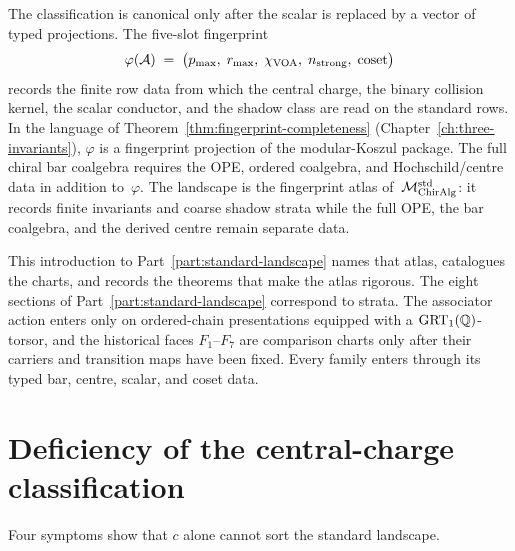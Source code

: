 The classification is canonical only after the scalar is replaced by
a vector of typed projections. The five-slot fingerprint
\begin{equation}
 \varphi(\mathcal{A}) \;=\; \bigl(p_{\max},\; r_{\max},\;
 \chi_{\mathrm{VOA}},\; n_{\mathrm{strong}},\; \mathrm{coset}\bigr)
 \label{eq:part-iii-fingerprint}
\end{equation}
records the finite row data from which the central charge, the
binary collision kernel, the scalar conductor, and the shadow
class are read on the standard rows. In the language of
Theorem~\ref{thm:fingerprint-completeness}
\textup{(}Chapter~\ref{ch:three-invariants}\textup{)}, $\varphi$ is
a fingerprint projection of the modular-Koszul package. The full
chiral bar coalgebra requires the OPE, ordered coalgebra, and
Hochschild/centre data in addition to~$\varphi$. The landscape is the
fingerprint atlas of~$\mathcal{M}_{\mathrm{ChirAlg}}^{\mathrm{std}}$: it records
finite invariants and coarse shadow strata while the full OPE, the bar
coalgebra, and the derived centre remain separate data.

This introduction to Part~\ref{part:standard-landscape}
names that atlas, catalogues the charts, and records the theorems that
make the atlas rigorous. The eight sections of
Part~\ref{part:standard-landscape} correspond to strata. The
associator action enters only on ordered-chain presentations equipped
with a $\mathrm{GRT}_1(\mathbb{Q})$-torsor, and the historical faces $F_1$--$F_7$ are
comparison charts only after their carriers and transition maps have
been fixed. Every family enters through its typed bar, centre, scalar,
and coset data.

\section{Deficiency of the central-charge classification}
\label{sec:part-iii-deficiency}

Four symptoms show that $c$ alone cannot sort the standard landscape.

